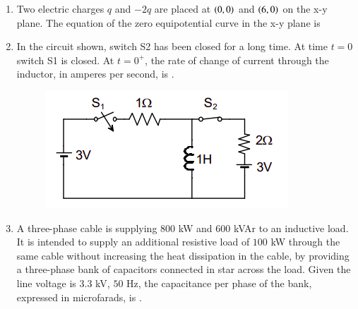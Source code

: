 \documentclass[journal,12pt,onecolumn]{IEEEtran}
\theoremstyle{remark}
\begin{document}
\begin{enumerate}[start=1, label=Q.\arabic*]
    \hfill{}

    \item Two electric charges $q$ and $-2q$ are placed at $\left(0,0\right)$ and $\left(6,0\right)$ on the x-y plane. The equation of the zero equipotential curve in the x-y plane is
    \begin{enumerate}
    \end{enumerate}

    \hfill{}

    \item In the circuit shown, switch S2 has been closed for a long time. At time $t=0$ switch S1 is closed. At $t=0^+$, the rate of change of current through the inductor, in amperes per second, is \underline{\hspace{2cm}}.
    \begin{figure}[H]
        \includegraphics[width=0.5\columnwidth]{Figures/q39.png}
        \centering
        \caption{}
    \end{figure}

    \hfill{}

    \item A three-phase cable is supplying $800$ kW and $600$ kVAr to an inductive load. It is intended to supply an additional resistive load of $100$ kW through the same cable without increasing the heat dissipation in the cable, by providing a three-phase bank of capacitors connected in star across the load. Given the line voltage is $3.3$ kV, $50$ Hz, the capacitance per phase of the bank, expressed in microfarads, is \underline{\hspace{2cm}}.

    \hfill{}


\end{enumerate}
\end{document}
